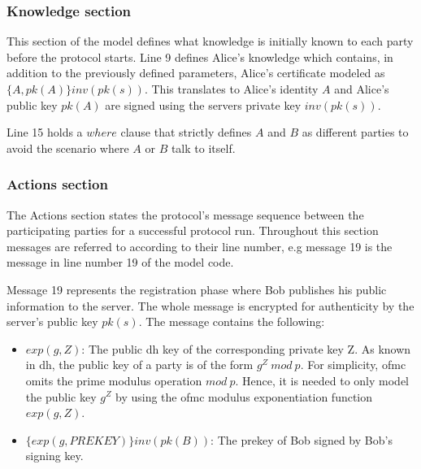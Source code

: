 \subsubsection{Knowledge section}
This section of the model defines what knowledge is initially known to each party before the protocol starts. Line 9 defines Alice's knowledge which contains, in addition to the previously defined parameters, Alice's certificate modeled as $\{A, pk(A)\}inv(pk(s))$. This translates to Alice's identity $A$ and Alice's public key $pk(A)$ are signed using the servers private key $inv(pk(s))$. 

Line 15 holds a $where$ clause that strictly defines $A$ and $B$ as different parties to avoid the scenario where $A$ or $B$ talk to itself.
\subsubsection{Actions section}
The Actions section states the protocol's message sequence between the participating parties for a successful protocol run. Throughout this section messages are referred to according to their line number, e.g message 19 is the message in line number 19 of the model code.
\par
Message 19 represents the registration phase where Bob publishes his public information to the server. The whole message is encrypted for authenticity by the server's public key $pk(s)$. The message contains the following:
\begin{itemize}
	\item $exp(g,Z)$: The public \gls{dh} key of the corresponding private key Z. As known in \gls{dh}, the public key of a party is of the form $g^{Z}\ mod\ p$. For simplicity, \gls{ofmc} omits the prime modulus operation $mod\ p$. Hence, it is needed to only model the public key $g^{Z}$ by using the \gls{ofmc} modulus exponentiation function $exp(g,Z)$.
	\item $\{exp(g,PREKEY)\}inv(pk(B))$: The prekey of Bob signed by Bob's signing key.
\end{itemize}

